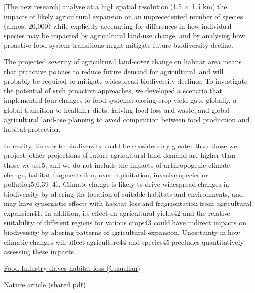 \documentclass[
]{book}
\begin{document}
{[}The new research{]} analyse at a high spatial resolution (1.5 × 1.5 km)
the impacts of likely agricultural expansion
on an unprecedented number of species (almost 20,000)
while explicitly accounting for differences in how individual species may be impacted
by agricultural land-use change,
and by analysing how proactive food-system transitions might mitigate future biodiversity decline.

The projected severity of agricultural land-cover change on habitat area means that proactive policies to reduce future demand for agricultural land will probably be required to mitigate widespread biodiversity declines. To investigate the potential of such proactive approaches, we developed a scenario that implemented four changes to food systems: closing crop yield gaps globally, a global transition to healthier diets, halving food loss and waste, and global agricultural land-use planning to avoid competition between food production and habitat protection.

In reality, threats to biodiversity could be considerably greater than those we project: other projections of future agricultural land demand are higher than those we use5, and we do not include the impacts of anthropogenic climate change, habitat fragmentation, over-exploitation, invasive species or pollution5,6,39--41. Climate change is likely to drive widespread changes in biodiversity by altering the location of suitable habitats and environments, and may have synergistic effects with habitat loss and fragmentation from agricultural expansion41. In addition, its effect on agricultural yields42 and the relative suitability of different regions for various crops43 could have indirect impacts on biodiversity by altering patterns of agricultural expansion. Uncertainty in how climatic changes will affect agriculture44 and species45 precludes quantitatively assessing these impacts

\href{https://www.theguardian.com/environment/2020/dec/21/global-food-industry-to-drive-rapid-habitat-loss-research}{Food Industry drives habitat loss (Guardian)}

\href{https://www.nature.com/articles/s41893-020-00656-5.epdf?sharing_token=R2MS-n7EpYm6CQn6PyyqL9RgN0jAjWel9jnR3ZoTv0O6RrkjpmW9fP_y1r0KlZ-Jx6UWX_jcBOXnlP2cYuEslvZu1-m7EgvCszD8mx-fwAIyiIh3Gx1tvRg-Geb5oZYMrgHYywVW7ovXIyZGEpuBr79zSzsD8wwHk_mBt8B8l1kD4xX_vLU2HtS04lrY7S9dTPE2uBW6UFWvOPGd3COAVQjH2qEEkkmbXzsW9f9DQh3JSJxMsDCiFz84VmI_GLPqG-tl6sb70A-DTfHoDYnqvlncEQlHNJLKvMauKaoH-1acinO7dw5-2OW3LzB2QDW-3G7YVVO3x8J2MOFAfUTTGlrNf0ZNDDvSOygvJ1S5z0E6Chteld_Pgugf-yhbLXH9t5TkqNaBYlrrKXb-bgmBYr68yQbKOcBwQy7EfcgOgAnmIVbitCX94Y-_DdD00Vp3YRsOm9AhIG2fmkWzW8OY4nB4Bi2BafrHNNHniHbTJidRx5Uxm8_GFX9tykH3e_M00qDlLJhxMWq1Tl45zu6vdQ\%3D\%3D\&tracking_referrer=www.theguardian.com}{Nature article (shared pdf)}
\end{document}
